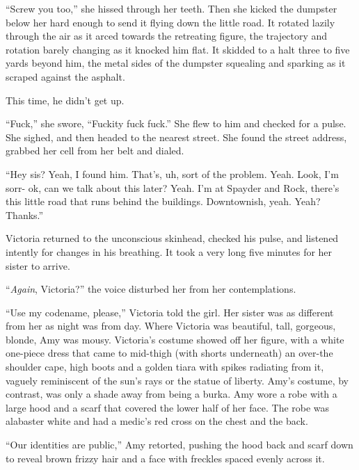 ``Screw you too,'' she hissed through her teeth.  Then she kicked the dumpster below her hard enough to send it flying down the little road.  It rotated lazily through the air as it arced towards the retreating figure, the trajectory and rotation barely changing as it knocked him flat.  It skidded to a halt three to five yards beyond him, the metal sides of the dumpster squealing and sparking as it scraped against the asphalt.



This time, he didn't get up.



``Fuck,'' she swore, ``Fuckity fuck fuck.''  She flew to him and checked for a pulse.  She sighed, and then headed to the nearest street.  She found the street address, grabbed her cell from her belt and dialed.



``Hey sis?  Yeah, I found him.  That's, uh, sort of the problem.  Yeah.  Look, I'm sorr- ok, can we talk about this later?  Yeah.  I'm at Spayder and Rock, there's this little road that runs behind the buildings.  Downtownish, yeah.  Yeah?  Thanks.''



Victoria returned to the unconscious skinhead, checked his pulse, and listened intently for changes in his breathing.  It took a very long five minutes for her sister to arrive.



``\emph{Again}, Victoria?'' the voice disturbed her from her contemplations.



``Use my codename, please,'' Victoria told the girl.  Her sister was as different from her as night was from day.  Where Victoria was beautiful, tall, gorgeous, blonde, Amy was mousy.  Victoria's costume showed off her figure, with a white one-piece dress that came to mid-thigh (with shorts underneath) an over-the shoulder cape, high boots and a golden tiara with spikes radiating from it, vaguely reminiscent of the sun's rays or the statue of liberty.  Amy's costume, by contrast, was only a shade away from being a burka.  Amy wore a robe with a large hood and a scarf that covered the lower half of her face.  The robe was alabaster white and had a medic's red cross on the chest and the back.



``Our identities are public,'' Amy retorted, pushing the hood back and scarf down to reveal brown frizzy hair and a face with freckles spaced evenly across it.



